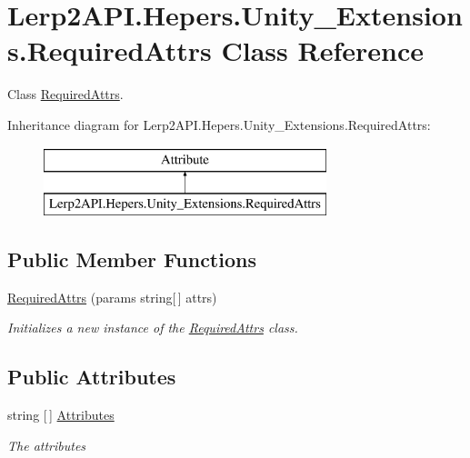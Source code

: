 \hypertarget{class_lerp2_a_p_i_1_1_hepers_1_1_unity___extensions_1_1_required_attrs}{}\section{Lerp2\+A\+P\+I.\+Hepers.\+Unity\+\_\+\+Extensions.\+Required\+Attrs Class Reference}
\label{class_lerp2_a_p_i_1_1_hepers_1_1_unity___extensions_1_1_required_attrs}


Class \hyperlink{class_lerp2_a_p_i_1_1_hepers_1_1_unity___extensions_1_1_required_attrs}{Required\+Attrs}.  


Inheritance diagram for Lerp2\+A\+P\+I.\+Hepers.\+Unity\+\_\+\+Extensions.\+Required\+Attrs\+:\begin{figure}[H]
\begin{center}
\leavevmode
\includegraphics[height=2.000000cm]{class_lerp2_a_p_i_1_1_hepers_1_1_unity___extensions_1_1_required_attrs}
\end{center}
\end{figure}
\subsection*{Public Member Functions}
\begin{DoxyCompactItemize}
\item 
\hyperlink{class_lerp2_a_p_i_1_1_hepers_1_1_unity___extensions_1_1_required_attrs_a9bbd262d6c44145d2cb24e84788fb60c}{Required\+Attrs} (params string\mbox{[}$\,$\mbox{]} attrs)
\begin{DoxyCompactList}\small\item\em Initializes a new instance of the \hyperlink{class_lerp2_a_p_i_1_1_hepers_1_1_unity___extensions_1_1_required_attrs}{Required\+Attrs} class. \end{DoxyCompactList}\end{DoxyCompactItemize}
\subsection*{Public Attributes}
\begin{DoxyCompactItemize}
\item 
string \mbox{[}$\,$\mbox{]} \hyperlink{class_lerp2_a_p_i_1_1_hepers_1_1_unity___extensions_1_1_required_attrs_a2d4712696a777f3708e516825cf18211}{Attributes}
\begin{DoxyCompactList}\small\item\em The attributes \end{DoxyCompactList}\end{DoxyCompactItemize}


